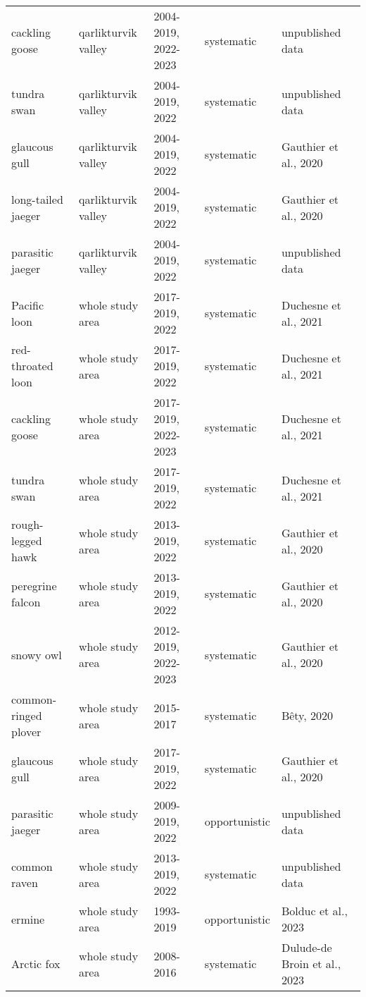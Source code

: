 \begin{table}[ht]
\begin{tabularx}{\textwidth}{lllll}
  cackling goose & qarlikturvik valley & 2004-2019, 2022-2023 & systematic & unpublished data \\ 
  tundra swan & qarlikturvik valley & 2004-2019, 2022 & systematic & unpublished data \\ 
  glaucous gull & qarlikturvik valley & 2004-2019, 2022 & systematic & Gauthier et al., 2020 \\ 
  long-tailed jaeger & qarlikturvik valley & 2004-2019, 2022 & systematic & Gauthier et al., 2020 \\ 
  parasitic jaeger & qarlikturvik valley & 2004-2019, 2022 & systematic & unpublished data \\ 
  Pacific loon & whole study area & 2017-2019, 2022 & systematic & Duchesne et al., 2021 \\ 
  red-throated loon & whole study area & 2017-2019, 2022 & systematic & Duchesne et al., 2021 \\ 
  cackling goose & whole study area & 2017-2019, 2022-2023 & systematic & Duchesne et al., 2021 \\ 
  tundra swan & whole study area & 2017-2019, 2022 & systematic & Duchesne et al., 2021 \\ 
  rough-legged hawk & whole study area & 2013-2019, 2022 & systematic & Gauthier et al., 2020 \\ 
  peregrine falcon & whole study area & 2013-2019, 2022  & systematic & Gauthier et al., 2020 \\ 
  snowy owl & whole study area & 2012-2019, 2022-2023 & systematic & Gauthier et al., 2020 \\ 
  common-ringed plover & whole study area & 2015-2017 & systematic & Bêty, 2020 \\ 
  glaucous gull & whole study area & 2017-2019, 2022 & systematic & Gauthier et al., 2020 \\ 
  parasitic jaeger & whole study area & 2009-2019, 2022 & opportunistic & unpublished data \\ 
  common raven & whole study area & 2013-2019, 2022 & systematic & unpublished data \\ 
  ermine & whole study area & 1993-2019 & opportunistic & Bolduc et al., 2023 \\ 
  Arctic fox & whole study area & 2008-2016 & systematic & Dulude-de Broin et al., 2023 \\ 
   \hline
\end{tabularx}
\endgroup
\end{table}
